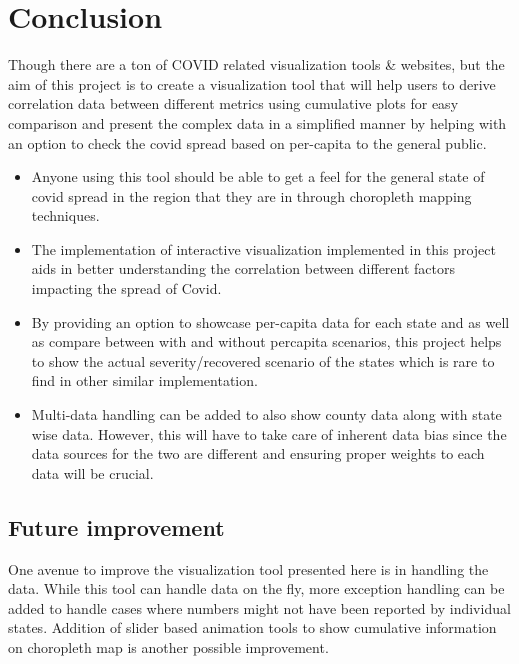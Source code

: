 \section{Conclusion}
\label{sec:conclusion}
Though there are a ton of COVID related visualization tools \& websites, but the aim of this project is to create a visualization tool that will help users to derive correlation data between different metrics using cumulative plots for easy comparison and present the complex data in a simplified manner by helping with an option to check the covid spread based on per-capita to the general public.  

\begin{itemize}
\item Anyone using this tool should be able to get a feel for the general state of covid spread in the region that they are in through choropleth mapping techniques. 
\item The implementation of interactive visualization implemented in this project aids in better understanding the correlation between different factors impacting the spread of Covid. 
\item By providing an option to showcase per-capita data for each state and as well as compare between with and without percapita scenarios, this project helps to show the actual severity/recovered scenario of the states which is rare to find in other similar implementation.
\item Multi-data handling can be added to also show county data along with state wise data. However, this will have to take care of inherent data bias since the data sources for the two are different and ensuring proper weights to each data will be crucial.
\end{itemize}


\subsection{Future improvement}
One avenue to improve the visualization tool presented here is in handling the data. While this tool can handle data on the fly, more exception handling can be added to handle cases where numbers might not have been reported by individual states. Addition of slider based animation tools to show cumulative information on choropleth map is another possible improvement.

